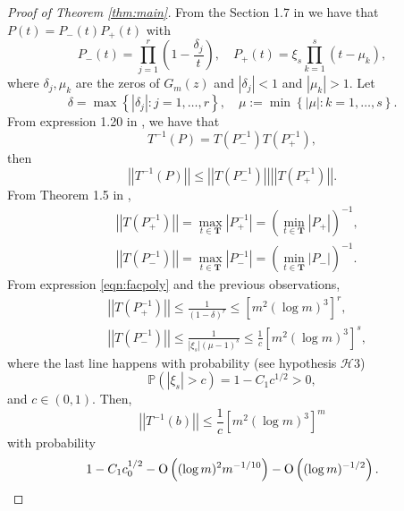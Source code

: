 \documentclass[12pt]{amsart}
\theoremstyle{plain}
\numberwithin{equation}{section}
\renewcommand{\Pr}{\mathbb{P}}
\newcommand{\<}{\langle}
\renewcommand{\>}{\rangle}
\newcommand{\PP}[1]{\left(#1\right)}
\newcommand{\CC}[1]{\left[#1\right]}
\newcommand{\LL}[1]{\left\{#1\right\}}
\newcommand{\abs}[1]{\left|#1\right|}
\newcommand{\norm}[1]{\left|\left|#1\right|\right|}
\renewcommand{\Pr}[1]{\mathds{P}\left(#1\right)}
\begin{document}
\begin{proof}[Proof of Theorem \ref{thm:main}]
From the Section 1.7 in \cite{bottcher2005spectral} we have that $P(t) = P_{-}(t) P_{+}(t)$ with
\begin{equation}\label{eqn:facpoly}
P_{-}(t) = \prod_{j=1}^{r} \PP{ 1 - \frac{\delta_j}{t} },\quad P_{+}(t) = \xi_s \prod_{k=1}^{s} \PP{ t - \mu_k },
\end{equation}
where $\delta_j, \mu_k$ are the zeros of $G_m(z)$ and $\abs{\delta_j} < 1$ and $\abs{\mu_k}>1$. Let 
\begin{equation}\label{eqn:delta.mu}
\delta = \max\LL{\abs{\delta_j} : j=1,\ldots,r}, \quad \mu:=\min\LL{\abs{\mu}: k=1,\ldots, s}.
\end{equation}
From expression 1.20 in \cite{bottcher2005spectral}, we have that
\[
T^{-1}(P) = T(P_{-}^{-1}) T(P_{+}^{-1}),
\]
then
\[
\norm{ T^{-1}(P) } \leq \norm{ T(P_{-}^{-1}) } \norm{ T(P_{+}^{-1}) }.
\]
From Theorem 1.5 in \cite{bottcher2005spectral},
\begin{align*}
& \norm{ T(P_{+}^{-1}) } = \max_{t\in\mathbf{T}} \abs{P_{+}^{-1}} = \PP{\min_{t\in\mathbf{T}} \abs{P_{+}} }^{-1}, \\
& \norm{ T(P_{-}^{-1}) } = \max_{t\in\mathbf{T}} \abs{P_{-}^{-1}} = \PP{\min_{t\in\mathbf{T}} \abs{P_{-}} }^{-1}.
\end{align*}
From expression \ref{eqn:facpoly} and the previous observations, 
\begin{align*}
& \norm{ T(P_{+}^{-1}) } \leq \frac{1}{(1-\delta)^r} \leq \CC{ m^2(\log m)^3 }^{r}, \\
& \norm{ T(P_{-}^{-1}) } \leq \frac{1}{\abs{\xi_s}(\mu - 1)^s} \leq \frac{1}{c} \CC{ m^2 (\log m )^3 }^{s},
\end{align*}
where the last line happens with probability (see hypothesis $\mathcal{H}3$)
\[
\Pr{\abs{\xi_s} > c } = 1 - C_1 c^{1/2} > 0,
\]
and $c\in(0,1)$. Then,
\[
\norm{T^{-1}(b)} \leq \frac{1}{c} \CC{m^2 (\log m)^{3} }^{m}
\]
with probability
\[
1 - C_1 c_0^{1/2} - \textnormal{O}\PP{ (\log m)^2 m^{-1/10} } - \textnormal{O}\PP{(\log m)^{-1/2}}.
\]


\end{proof}
\end{document}
